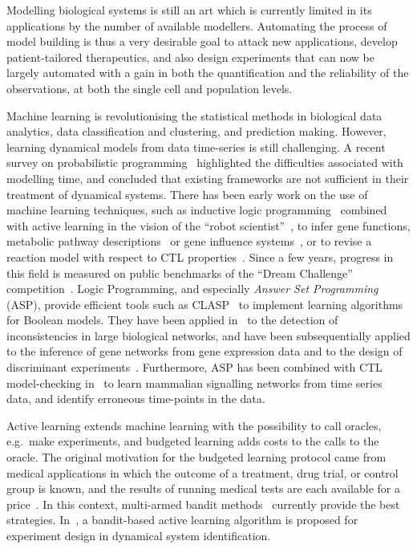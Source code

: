 \documentclass{llncs}
\begin{document}
Modelling biological systems is still an art which is currently limited in its applications by the number of available modellers.
Automating the process of model building is thus a very desirable goal
to attack new applications, develop patient-tailored therapeutics,
and also design experiments that can now be largely automated
with a gain in both the quantification and the reliability of the observations, at both the single cell and population levels.

Machine learning is revolutionising the statistical methods in biological data analytics,
data classification and clustering, and prediction making.
However, learning dynamical models from data time-series is still challenging.
A recent survey on probabilistic programming~\cite{GHNR14fose}
highlighted the difficulties associated with modelling time,
and concluded that existing frameworks are not sufficient in their treatment of dynamical systems.
There has been early work on the use of machine learning techniques, such as inductive
 logic programming~\cite{Muggleton95ngc} combined with active learning in the vision of the ``robot scientist''~\cite{BMOKRK01etai},
to infer gene functions,
metabolic pathway descriptions~\cite{AM02etai,AM02slps}
or gene influence systems~\cite{BCRG04jtb},
or to revise a reaction model with respect to CTL properties~\cite{CCFS06tcsb}.
Since a few years, progress in this field is measured on public benchmarks
of the ``Dream Challenge'' competition~\cite{Meyer14bmc}.
Logic Programming, and especially \emph{Answer Set Programming} (ASP), provide efficient tools such as CLASP~\cite{GKNS07lpnmr}
to implement learning algorithms for Boolean models.
They have been applied in~\cite{GSTUV08iclp} to the detection of  inconsistencies in large biological networks,
and have been subsequentially applied to the inference of gene networks from gene expression data and to the design of discriminant experiments~\cite{VKASSSG15frontiers}.
Furthermore, ASP has been combined with CTL model-checking in~\cite{OPSSG16biosystems} to learn mammalian signalling networks from time series data,
and identify erroneous time-points in the data.

Active learning extends machine learning with the possibility to call oracles, e.g.~make experiments,
and budgeted learning adds costs to the calls to the oracle.
The original motivation for the budgeted learning protocol came from medical applications in which the outcome of a treatment,
drug trial, or control group is known, and the results of running medical tests are each available for a price~\cite{DZBSM13ml}.
In this context, multi-armed bandit methods~\cite{DBSSZ07icdm} currently provide the best strategies.
In~\cite{LMALS14ecml}, a bandit-based active learning algorithm is proposed for experiment design in dynamical system identification.
\end{document}
